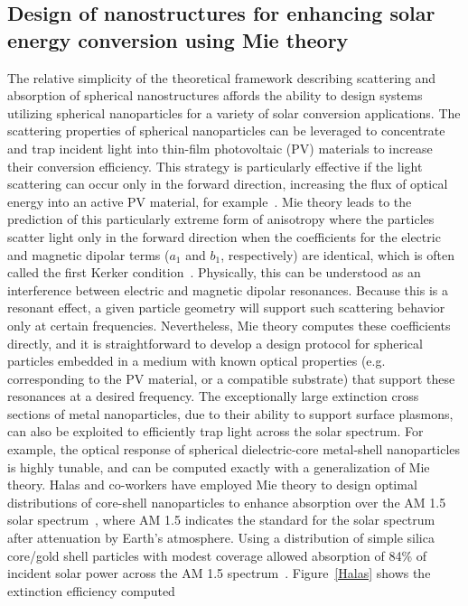 \documentclass[10pt,letterpaper]{article}
\begin{document}
\subsection{Design of nanostructures for enhancing solar energy conversion using Mie theory}
The relative simplicity of the theoretical framework describing scattering and absorption of spherical 
nanostructures affords the ability to design
systems utilizing spherical nanoparticles for a variety of solar conversion applications.  The scattering properties of
spherical nanoparticles can be leveraged to concentrate and trap incident light into thin-film photovoltaic (PV) materials to increase their
conversion efficiency.  This strategy is particularly effective if the light scattering can occur only in the forward direction, increasing
the flux of optical energy into an active PV material, for example~\cite{AP_NatMat_2010}.
Mie theory
leads to the prediction of this particularly extreme form of anisotropy where the particles scatter light only in the
forward direction when the coefficients for the electric and magnetic dipolar terms ($a_1$ and $b_1$, respectively) 
are identical, which is often called the first Kerker condition~\cite{GGG_NatComm_2012}.
Physically, this can be understood as an interference between electric
and magnetic dipolar resonances.   Because this is a resonant effect, a given particle geometry will support such scattering behavior
only at certain frequencies.  Nevertheless, Mie theory computes these coefficients directly, and it is straightforward to develop a
design protocol for spherical particles embedded in a medium with known optical properties (e.g. corresponding to the PV material, or a
compatible substrate) that support these resonances at a desired frequency.  The exceptionally large extinction cross sections
of metal nanoparticles, due to their ability to support surface plasmons, can also be exploited to efficiently trap light across
the solar spectrum.  For example, the optical response of spherical dielectric-core metal-shell nanoparticles is highly tunable, and can be
computed exactly with a generalization of Mie theory.  Halas and co-workers have employed Mie theory to
design optimal distributions of core-shell nanoparticles to enhance absorption over the AM 1.5 solar 
spectrum~\cite{CH_APL_2006}, where AM 1.5 indicates the standard for the solar 
spectrum after attenuation by Earth's atmosphere.
Using a distribution of simple silica core/gold shell particles with modest coverage allowed absorption of 84\% of incident solar power
across the AM 1.5 spectrum~\cite{CH_APL_2006}.  Figure~\ref{Halas} shows the extinction efficiency computed
\end{document}
